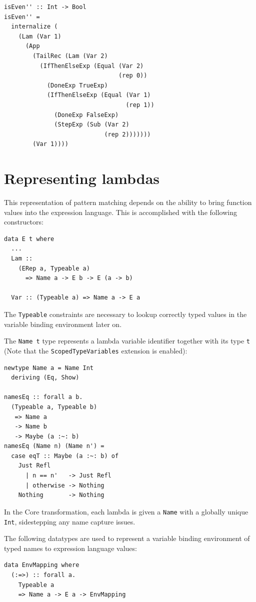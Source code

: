 \documentclass[runningheads, a4paper]{llncs}
\newcommand{\ttt}{\texttt}
\begin{document}
\begin{lstlisting}
isEven'' :: Int -> Bool
isEven'' =
  internalize (
    (Lam (Var 1)
      (App
        (TailRec (Lam (Var 2)
          (IfThenElseExp (Equal (Var 2)
                                (rep 0))
            (DoneExp TrueExp)
            (IfThenElseExp (Equal (Var 1)
                                  (rep 1))
              (DoneExp FalseExp)
              (StepExp (Sub (Var 2)
                            (rep 2)))))))
        (Var 1))))
\end{lstlisting}

\section{Representing lambdas}
\label{sec:LamRep}

This representation of pattern matching depends on the ability to bring
function values into the expression language. This is accomplished
with the following constructors:

\begin{lstlisting}
data E t where
  ...
  Lam ::
    (ERep a, Typeable a)
      => Name a -> E b -> E (a -> b)

  Var :: (Typeable a) => Name a -> E a
\end{lstlisting}

The \ttt{Typeable} constraints are necessary to lookup correctly typed
values in the variable binding environment later on.

The \ttt{Name t} type represents a lambda variable identifier together with its
type \ttt{t} (Note that the \ttt{ScopedTypeVariables} extension is enabled):

\begin{lstlisting}
newtype Name a = Name Int
  deriving (Eq, Show)

namesEq :: forall a b.
  (Typeable a, Typeable b)
   => Name a
   -> Name b
   -> Maybe (a :~: b)
namesEq (Name n) (Name n') =
  case eqT :: Maybe (a :~: b) of
    Just Refl
      | n == n'   -> Just Refl
      | otherwise -> Nothing
    Nothing       -> Nothing
\end{lstlisting}

In the Core transformation, each lambda is given a \ttt{Name} with a globally
unique \ttt{Int}, sidestepping any name capture issues.

The following datatypes are used to represent a variable binding environment
of typed names to expression language values:

\begin{lstlisting}
data EnvMapping where
  (:=>) :: forall a.
    Typeable a
    => Name a -> E a -> EnvMapping
\end{lstlisting}
\end{document}
